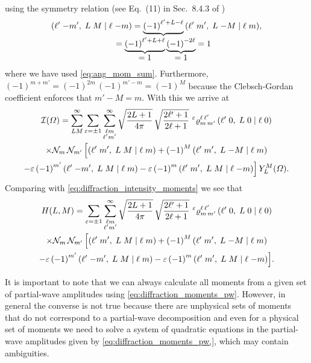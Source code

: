 using the symmetry relation (see Eq.~(11) in Sec.~8.4.3 of
)
\begin{equation}
  \clebsch{\ell'}{-m'}{L}{M}{\ell}{-m}
  = \cdUnderbrace{{(-1)}^{\ell' + L - \ell}}{= \dUnderbrace{{(-1)}^{\ell' + L + \ell}}{= 1}\, \dUnderbrace{{(-1)}^{-2 \ell}}{= 1} = 1}\, \clebsch{\ell'}{m'}{L}{-M}{\ell}{m},
\end{equation}
where we have used \cref{eq:ang_mom_sum}.  Furthermore, ${(-1)}^{m + m'}
= {(-1)}^{2m}\, {(-1)}^{m' - m} = {(-1)}^M$ because the Clebsch-Gordan
coefficient enforces that $m' - M = m$.  With this we arrive at
\begin{multline}
  \mathcal{I}(\Omega)
  = \sum_{L M}^\infty \sum_{\varepsilon = \pm 1} \sum_{\substack{\ell m \\ \ell' m'}}^\infty
    \sqrt{\frac{2 L + 1}{4 \pi}}\, \sqrt{\frac{2 \ell' + 1}{2 \ell + 1}}\,
    \prescript{\ensuremath{\varepsilon}}{}{\varrho}^{\ell\, \ell'}_{m\, m'}\, ({\ell'}\;{0},\;{L}\;{0}\; |\; {\ell}\;{0}) \\
    \times \mathcal{N}_m\, \mathcal{N}_{m'}\, \Big[
      ({\ell'}\;{m'},\;{L}\;{M}\; |\; {\ell}\;{m})
      + {(-1)}^M\, ({\ell'}\;{m'},\;{L}\;{-M}\; |\; {\ell}\;{m}) \\
      - \varepsilon\, {(-1)}^{m'}\, ({\ell'}\;{-m'},\;{L}\;{M}\; |\; {\ell}\;{m})
      - \varepsilon\, {(-1)}^m\, ({\ell'}\;{m'},\;{L}\;{M}\; |\; {\ell}\;{-m}) \Big]\,
    Y_L^M(\Omega).
\end{multline}
Comparing with \cref{eq:diffraction_intensity_moments} we see that
\begin{multline}
  \label{eq:diffraction_moments_pw}
  H(L, M)
  = \sum_{\varepsilon = \pm 1} \sum_{\substack{\ell m \\ \ell' m'}}^\infty
    \sqrt{\frac{2 L + 1}{4 \pi}}\, \sqrt{\frac{2 \ell' + 1}{2 \ell + 1}}\,
    \prescript{\ensuremath{\varepsilon}}{}{\varrho}^{\ell\, \ell'}_{m\, m'}\, ({\ell'}\;{0},\;{L}\;{0}\; |\; {\ell}\;{0}) \\
    \times \mathcal{N}_m\, \mathcal{N}_{m'}\, \Big[
      ({\ell'}\;{m'},\;{L}\;{M}\; |\; {\ell}\;{m})
      + {(-1)}^M\, ({\ell'}\;{m'},\;{L}\;{-M}\; |\; {\ell}\;{m}) \\
      - \varepsilon\, {(-1)}^{m'}\, ({\ell'}\;{-m'},\;{L}\;{M}\; |\; {\ell}\;{m})
      - \varepsilon\, {(-1)}^m\, ({\ell'}\;{m'},\;{L}\;{M}\; |\; {\ell}\;{-m}) \Big].
\end{multline}

It is important to note that we can always calculate all moments from
a given set of partial-wave amplitudes using
\cref{eq:diffraction_moments_pw}.  However, in general the converse is
not true because there are unphysical sets of moments that do not
correspond to a partial-wave decomposition and even for a physical set
of moments we need to solve a system of quadratic equations in the
partial-wave amplitudes given by \cref{eq:diffraction_moments_pw,},
which may contain ambiguities.

